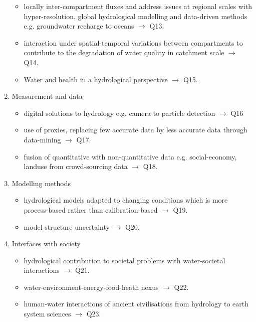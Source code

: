 \documentclass{article}
\begin{document}
\begin{enumerate}
\begin{itemize}
            \item locally inter-compartment fluxes and address issues at regional scales with hyper-resolution, global hydrological modelling and data-driven methods e.g. groundwater recharge to oceans $\rightarrow$ Q13.
            \item interaction under spatial-temporal variations between compartments to contribute to the degradation of water quality in catchment scale $\rightarrow$ Q14.
            \item Water and health in a hydrological perspective $\rightarrow$ Q15.
        \end{itemize}
        \item Measurement and data
        \begin{itemize}
            \item digital solutions to hydrology e.g. camera to particle detection $\rightarrow$ Q16
            \item use of proxies, replacing few accurate data by less accurate data through data-mining $\rightarrow$ Q17.
            \item fusion of quantitative with non-quantitative data e.g. social-economy, landuse from crowd-sourcing data $\rightarrow$ Q18.
        \end{itemize}
        \item Modelling methods
        \begin{itemize}
            \item hydrological models adapted to changing conditions which is more process-based rather than calibration-based $\rightarrow$ Q19.
            \item model structure uncertainty $\rightarrow$ Q20.
        \end{itemize}
        \item Interfaces with society
        \begin{itemize}
            \item hydrological contribution to societal problems with water-societal interactions $\rightarrow$ Q21.
            \item water-environment-energy-food-heath nexus $\rightarrow$ Q22.
            \item human-water interactions of ancient civilisations from hydrology to earth system sciences $\rightarrow$ Q23.
        \end{itemize}
    \end{enumerate}
\end{document}
